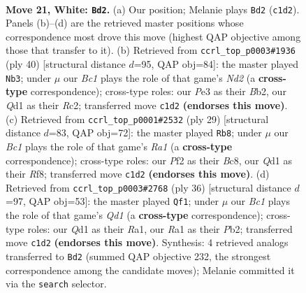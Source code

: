 \documentclass[11pt]{article}
\begin{document}
\clearpage

\begin{figure}[p]\centering
\begin{subfigure}{0.46\textwidth}\centering
\resizebox{\linewidth}{!}{%
\newchessgame
\chessboard[
  setfen={r3r3/1ppb1pkp/2n5/p2p2b1/3P2P1/NP2P3/P4P1q/RNBQRK2 w - - 5 21},
  showmover=false,
  pgfstyle=straightmove, color=movearrow, markmove={c1-d2}
]}
\caption{}
\end{subfigure}\hfill
\begin{subfigure}{0.46\textwidth}\centering
\resizebox{\linewidth}{!}{%
\newchessgame
\chessboard[
  setfen={3r1rk1/p3pp1p/1qp1b1p1/4Pn2/2PP4/8/PBRNQ1PP/4R1K1 w - - 3 21},
  showmover=false,
  pgfstyle=straightmove, color=movearrow, markmove={d2-b3}
]}
\caption{}
\end{subfigure}
\\[4pt]
\begin{subfigure}{0.46\textwidth}\centering
\resizebox{\linewidth}{!}{%
\newchessgame
\chessboard[
  setfen={r1b2rk1/2qnpp1p/p1pp2p1/8/N1B1P3/2Q5/PPP2PPP/2KR3R b - - 0 15},
  showmover=false,
  pgfstyle=straightmove, color=movearrow, markmove={a8-b8}
]}
\caption{}
\end{subfigure}\hfill
\begin{subfigure}{0.46\textwidth}\centering
\resizebox{\linewidth}{!}{%
\newchessgame
\chessboard[
  setfen={r4rk1/pp4np/2pb4/3p4/Bn1P1P2/7q/PPPKNB1P/R2Q3R w - - 4 19},
  showmover=false,
  pgfstyle=straightmove, color=movearrow, markmove={d1-f1}
]}
\caption{}
\end{subfigure}
\caption{\textbf{Move 21, White: \texttt{Bd2}.} (a) Our position; Melanie plays \texttt{Bd2} (\texttt{c1d2}). Panels (b)--(d) are the retrieved master positions whose correspondence most drove this move (highest QAP objective among those that transfer to it). (b) Retrieved from \texttt{ccrl\_top\_p0003\#1936} (ply 40) [structural distance $d$=95, QAP obj=84]: the master played \texttt{Nb3}; under $\mu$ our \emph{Bc1} plays the role of that game's \emph{Nd2} (a \textbf{cross-type} correspondence); cross-type roles: our \emph{P}e3 as their \emph{B}b2, our \emph{Q}d1 as their \emph{R}c2; transferred move \texttt{c1d2} \textbf{(endorses this move)}. (c) Retrieved from \texttt{ccrl\_top\_p0001\#2532} (ply 29) [structural distance $d$=83, QAP obj=72]: the master played \texttt{Rb8}; under $\mu$ our \emph{Bc1} plays the role of that game's \emph{Ra1} (a \textbf{cross-type} correspondence); cross-type roles: our \emph{P}f2 as their \emph{B}c8, our \emph{Q}d1 as their \emph{R}f8; transferred move \texttt{c1d2} \textbf{(endorses this move)}. (d) Retrieved from \texttt{ccrl\_top\_p0003\#2768} (ply 36) [structural distance $d$=97, QAP obj=53]: the master played \texttt{Qf1}; under $\mu$ our \emph{Bc1} plays the role of that game's \emph{Qd1} (a \textbf{cross-type} correspondence); cross-type roles: our \emph{Q}d1 as their \emph{R}a1, our \emph{R}a1 as their \emph{P}b2; transferred move \texttt{c1d2} \textbf{(endorses this move)}. Synthesis: 4 retrieved analogs transferred to \texttt{Bd2} (summed QAP objective 232, the strongest correspondence among the candidate moves); Melanie committed it via the \texttt{search} selector.}
\label{fig:thought-m40}
\end{figure}
\end{document}
